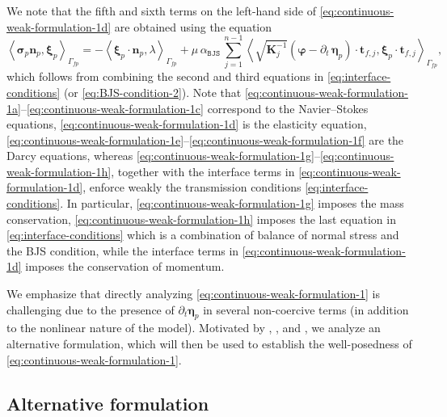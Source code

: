 \documentclass[11pt]{article}
\numberwithin{equation}{section}
\newcommand{\bbeta}{{\boldsymbol\eta}}
\newcommand{\bsi}{{\boldsymbol\sigma}}
\newcommand{\bvarphi}{{\boldsymbol\varphi}}
\newcommand{\bxi}{{\boldsymbol\xi}}
\newcommand{\bt}{{\mathbf{t}}}
\newcommand{\bn}{{\mathbf{n}}}
\newcommand{\0}{{\mathbf{0}}}
\def\bK{\mathbf{K}}
\def\BJS{\mathtt{BJS}}
\def\pil{\left<}
\def\pir{\right>}
\numberwithin{equation}{section}
\begin{document}
We note that the fifth and sixth terms on the left-hand side of \eqref{eq:continuous-weak-formulation-1d} are obtained using the equation
\begin{equation}\label{eq:elasticity-stress-tensor-identity}
\pil\bsi_p\bn_p,\bxi_p\pir_{\Gamma_{fp}} 
= - \pil\bxi_p\cdot\bn_p,\lambda\pir_{\Gamma_{fp}} 
+ \mu\,\alpha_{\BJS}\,\sum_{j=1}^{n-1} \pil\sqrt{\bK^{-1}_j}\left( \bvarphi - \partial_t\,\bbeta_p \right)\cdot\bt_{f,j},\bxi_p\cdot\bt_{f,j} \pir_{\Gamma_{fp}},
\end{equation}
which follows from combining the second and third equations in \eqref{eq:interface-conditions} (or \eqref{eq:BJS-condition-2}). 
Note that \eqref{eq:continuous-weak-formulation-1a}--\eqref{eq:continuous-weak-formulation-1c} correspond to the Navier--Stokes equations, \eqref{eq:continuous-weak-formulation-1d} is the elasticity equation, \eqref{eq:continuous-weak-formulation-1e}--\eqref{eq:continuous-weak-formulation-1f} are the Darcy equations, whereas \eqref{eq:continuous-weak-formulation-1g}--\eqref{eq:continuous-weak-formulation-1h}, together with the interface terms in \eqref{eq:continuous-weak-formulation-1d}, enforce weakly the transmission conditions \eqref{eq:interface-conditions}. 
In particular, \eqref{eq:continuous-weak-formulation-1g} imposes the mass conservation, \eqref{eq:continuous-weak-formulation-1h} imposes the last equation in \eqref{eq:interface-conditions} which is a combination of balance of normal stress and the BJS condition, while the interface terms in \eqref{eq:continuous-weak-formulation-1d} imposes the conservation of momentum.

We emphasize that directly analyzing \eqref{eq:continuous-weak-formulation-1} is challenging due to the presence of $\partial_t\bbeta_p$ in several non-coercive terms (in addition to the nonlinear nature of the model). 
Motivated by \cite{ejs2009}, \cite{s2005}, and \cite{aeny2019}, we analyze an alternative formulation, which will then be used to establish the well-posedness of \eqref{eq:continuous-weak-formulation-1}.

 
\subsection{Alternative formulation}
\end{document}
